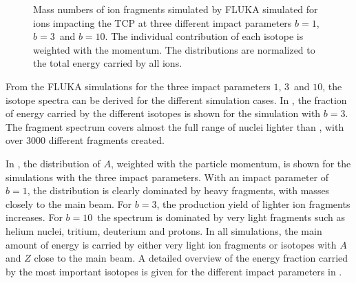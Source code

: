 \begin{figure}[htbp]
  \centering
  \caption{Mass numbers of ion fragments simulated by FLUKA simulated for \lead ions impacting the TCP at three different impact parameters $b=1$\mum, $b=3$\mum\, and $b=10$\mum. The individual contribution of each isotope is weighted with the momentum. The distributions are normalized to the total energy carried by all ions.}  
  \label{pic:16080302}
  \end{figure}


From the FLUKA simulations for the three impact parameters $1$\mum, $3$\mum\, and $10$\mum, the isotope spectra  can be derived for the different simulation cases. In , the fraction of energy carried by the different isotopes is shown for the simulation with $b=$$3$\mum. The fragment spectrum covers almost the full range of nuclei lighter than \lead, with over 3000 different fragments created. 

In , the distribution of $A$, weighted with the particle momentum, is shown for the simulations with the three impact parameters. With an impact parameter of $b=1$\mum, the distribution is clearly dominated by heavy fragments, with masses closely to the main beam. For $b=3$\mum, the production yield of lighter ion fragments increases. For \mbox{$b=10$\mum}\, the spectrum is dominated by very light fragments such as helium nuclei, tritium, deuterium and protons. In all simulations, the main amount of energy is carried by either very light ion fragments or isotopes with $A$ and $Z$ close to the main beam. 
\newpage
A detailed overview of the energy fraction carried by the most important isotopes is given for the different impact parameters in .

